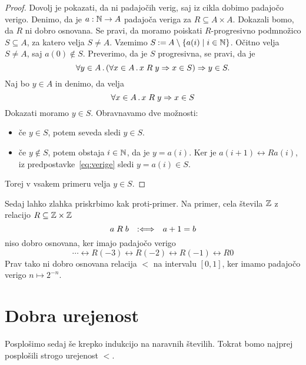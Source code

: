 \begin{proof}
  Dovolj je pokazati, da ni padajočih verig, saj iz cikla dobimo padajočo verigo.
  Denimo, da je $a : \mathbb{N} \to A$ padajoča veriga za $R \subseteq A \times A$. Dokazali bomo, da $R$ ni dobro
  osnovana. Se pravi, da moramo poiskati $R$-progresivno podmnožico $S \subseteq A$, za katero velja
  $S \neq A$. Vzemimo $S \mathbin{{:}{=}} A \setminus \left\{ a(i) \mid i \in \mathbb{N}\right\}$. Očitno velja $S \neq A$, saj 
  $a(0) \not\in S$. Preverimo, da je $S$ progresivna, se pravi, da je
  \begin{equation*}
    \forall y \in A \,.\, (\forall x \in A \,.\, x \mathrel{R} y \Rightarrow x \in S) \Rightarrow y \in S.
  \end{equation*}
  Naj bo $y \in A$ in denimo, da velja
  \begin{equation}
    \label{eq:verige}
    \forall x \in A \,.\, x \mathrel{R} y \Rightarrow x \in S
  \end{equation}
  Dokazati moramo $y \in S$. Obravnavamo dve možnosti:
  \begin{itemize}
  \item če $y \in S$, potem seveda sledi $y \in S$.
  \item če $y \not\in S$, potem obstaja $i \in \mathbb{N}$, da je $y = a(i)$. Ker je $a(i+1) \rel{R} a(i)$, iz
    predpostavke~\eqref{eq:verige} sledi $y = a(i) \in S$.
  \end{itemize}
  Torej v vsakem primeru velja $y \in S$.
\end{proof}

\begin{zgled}
  Sedaj lahko zlahka priskrbimo kak proti-primer. Na primer, cela števila $\mathbb{Z}$ z relacijo $R \subseteq \mathbb{Z} \times \mathbb{Z}$
  \begin{equation*}
    a \mathrel{R} b \quad {{:}{\Longleftrightarrow}}\quad a + 1 = b
  \end{equation*}
  niso dobro osnovana, ker imajo padajočo verigo
  \begin{equation*}
    \cdots \rel{R} (-3) \rel{R} (-2) \rel{R} (-1) \rel{R} 0
  \end{equation*}
  Prav tako ni dobro osnovana relacija $<$ na intervalu $[0,1]$, ker imamo padajočo verigo
  $n \mapsto 2^{-n}$.
\end{zgled}

\section{Dobra urejenost}

Posplošimo sedaj še krepko indukcijo na naravnih številih. Tokrat bomo najprej posplošili
strogo urejenost $<$.

